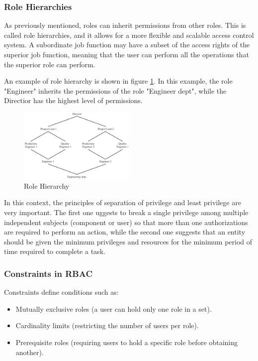 \subsubsection{Role Hierarchies}
As previously mentioned, roles can inherit permissions from other
roles. This is called role hierarchies, and it allows for a more
flexible and scalable access control system. A subordinate job
function may have a subset of the access rights of the superior job
function, meaning that the user can perform all the operations that 
the superior role can perform.

An example of role hierarchy is shown in figure
\ref{fig:role-hierarchy}. In this example, the role "Engineer"
inherits the permissions of the role "Engineer dept", while the
Directior has the highest level of permissions.

\begin{figure}[H]
  \centering
  \includegraphics[width=0.5\textwidth]{img/role hierarchy.png}
  \caption{Role Hierarchy}
  \label{fig:role-hierarchy}
\end{figure}

In this context, the principles of separation of privilege and least
privilege are very important. The first one uggests to break a single
privilege among multiple independent subjects (component or user) so
that more than one authorizations are required to perform an action,
while the second one suggests that an entity should be given the
minimum privileges and resources for the minimum period of time
required to complete a task.

\subsubsection{Constraints in RBAC}
Constraints define conditions such as:

\begin{itemize}
  \item Mutually exclusive roles (a user can hold only one role in a
    set).
  \item Cardinality limits (restricting the number of users per role).
  \item Prerequisite roles (requiring users to hold a specific role
    before obtaining another).
\end{itemize}

